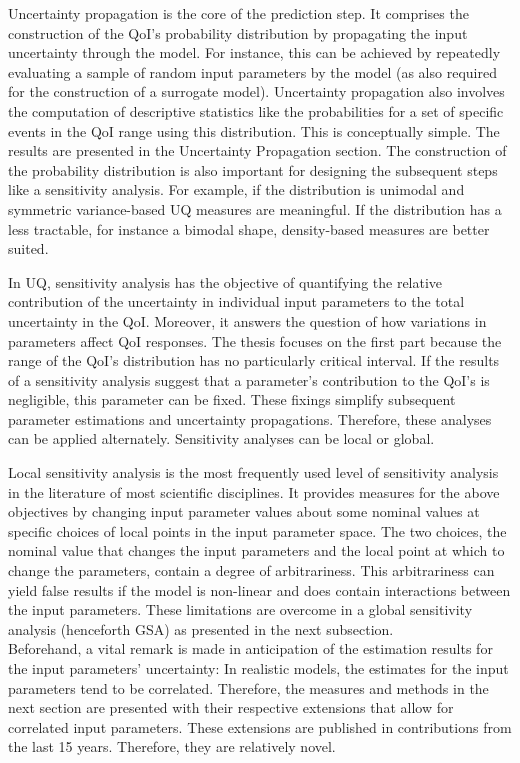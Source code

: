 Uncertainty propagation is the core of the prediction step. It comprises the construction of the QoI's probability distribution by propagating the input uncertainty through the model. For instance, this can be achieved by repeatedly evaluating a sample of random input parameters by the model (as also required for the construction of a surrogate model). Uncertainty propagation also involves the computation of descriptive statistics like the probabilities for a set of specific events in the QoI range using this distribution. This is conceptually simple. The results are presented in the Uncertainty Propagation section. The construction of the probability distribution is also important for designing the subsequent steps like a sensitivity analysis. For example, if the distribution is unimodal and symmetric variance-based UQ measures are meaningful. If the distribution has a less tractable, for instance a bimodal shape, density-based measures are better suited.

In UQ, sensitivity analysis has the objective of quantifying the relative contribution of the uncertainty in individual input parameters to the total uncertainty in the QoI. Moreover, it answers the question of how variations in parameters affect QoI responses. The thesis focuses on the first part because the range of the QoI's distribution has no particularly critical interval. If the results of a sensitivity analysis suggest that a parameter's contribution to the QoI's is negligible, this parameter can be fixed. These fixings simplify subsequent parameter estimations and uncertainty propagations. Therefore, these analyses can be applied alternately. Sensitivity analyses can be local or global.

Local sensitivity analysis is the most frequently used level of sensitivity analysis in the literature of most scientific disciplines. It provides measures for the above objectives by changing input parameter values about some nominal values at specific choices of local points in the input parameter space. The two choices, the nominal value that changes the input parameters and the local point at which to change the parameters, contain a degree of arbitrariness. This arbitrariness can yield false results if the model is non-linear and does contain interactions between the input parameters. These limitations are overcome in a global sensitivity analysis (henceforth GSA) as presented in the next subsection.\\
\newline
Beforehand, a vital remark is made in anticipation of the estimation results for the input parameters' uncertainty: In realistic models, the estimates for the input parameters tend to be correlated. Therefore, the measures and methods in the next section are presented with their respective extensions that allow for correlated input parameters. These extensions are published in contributions from the last 15 years. Therefore, they are relatively novel.

